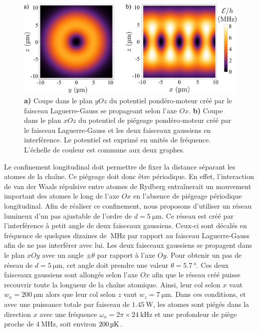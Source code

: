 \begin{figure}[h]
\centering
\includegraphics[width=\linewidth]{figures/circsim/pondero_trap}
\caption[Potentiel de piégeage pondéro-moteur]{
\textbf{a)} Coupe dans le plan $yOz$ du potentiel pondéro-moteur créé par le faisceau Laguerre-Gauss se propageant selon l'axe $Ox$.
\textbf{b)} Coupe dans le plan $xOz$ du potentiel de piégeage pondéro-moteur créé par le faisceau Laguerre-Gauss et les deux faisceaux gaussiens en interférence.
Le potentiel est exprimé en unités de fréquence. L'échelle de couleur est commune aux deux graphes.
}
\label{fig:pondero_trap}
\end{figure}
	
Le confinement longitudinal doit permettre de fixer la distance séparant les atomes de la chaîne.
Ce piégeage doit donc être périodique.
En effet, l'interaction de van der Waals répulsive entre atomes de Rydberg entraînerait un mouvement important des atomes le long de l'axe $Ox$ en l'absence de piégeage périodique longitudinal.
Afin de réaliser ce confinement, nous proposons d'utiliser un réseau lumineux d'un pas ajustable de l'ordre de $d=\SI{5}{\um}$.
Ce réseau est créé par l'interférence à petit angle de deux faisceaux gaussiens.
Ceux-ci sont décalés en fréquence de quelques dizaines de $\SI{}{\MHz}$ par rapport au faisceau Laguerre-Gauss afin de ne pas interférer avec lui.
Les deux faisceaux gaussiens se propagent dans le plan $xOy$ avec un angle $\pm \theta$ par rapport à l'axe $Oy$.
Pour obtenir un pas de réseau de $d=\SI{5}{\um}$, cet angle doit prendre une valeur $\theta=\SI{5.7}{\degree}$.
Ces deux faisceaux gaussiens sont allongés selon l'axe $Ox$ afin que le réseau créé puisse recouvrir toute la longueur de la chaîne atomique.
Ainsi, leur col selon $x$ vaut $w_x = \SI{200}{\um}$ alors que leur col selon $z$ vaut $w_z=\SI{7}{\um}$.
Dans ces conditions, et avec une puissance totale par faisceau de $\SI{1.45}{\watt}$, les atomes sont piégés dans la direction $x$ avec une fréquence $\omega_x = 2\pi \times \SI{24}{\kHz}$ et une profondeur de piège proche de $\SI{4}{\MHz}$, soit environ $\SI{200}{\si{\micro\kelvin}}$.

